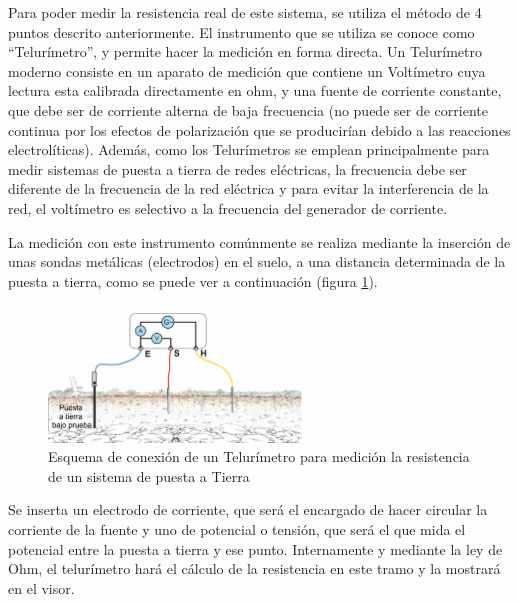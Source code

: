 Para poder medir la resistencia real de este sistema, se utiliza el método de 4 puntos descrito anteriormente. El instrumento que se utiliza se conoce como “Telurímetro”, y permite hacer la medición en forma directa. Un Telurímetro moderno consiste en un aparato de medición que contiene un Voltímetro cuya lectura esta calibrada directamente en ohm, y una fuente de corriente constante, que debe ser de corriente alterna de baja frecuencia (no puede ser de corriente continua por los efectos de polarización que se producirían debido a las reacciones electrolíticas). Además, como los Telurímetros se emplean principalmente para medir sistemas de puesta a tierra de redes eléctricas, la frecuencia debe ser diferente de la frecuencia de la red eléctrica y para evitar la interferencia de la red, el voltímetro es selectivo a la frecuencia del generador de corriente.

La medición con este instrumento comúnmente se realiza mediante la inserción de unas sondas metálicas (electrodos) en el suelo, a una distancia determinada de la puesta a tierra, como se puede ver a continuación (figura \ref{fig:circtelurimetro}). 

\begin{figure}[h!]
        \centering        
        \includegraphics[width=0.6\textwidth]{Imagenes/circTelur.png}
        \caption{Esquema de conexión de un Telurímetro para medición la resistencia de un sistema de puesta a Tierra}
        \label{fig:circtelurimetro}
\end{figure}

Se inserta un electrodo de corriente, que será el encargado de hacer circular la corriente de la fuente y uno de potencial o tensión, que será el que mida el potencial entre la puesta a tierra y ese punto. Internamente y mediante la ley de Ohm, el telurímetro hará el cálculo de la resistencia en este tramo y la mostrará en el visor. 